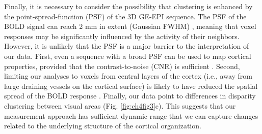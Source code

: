 Finally, it is necessary to consider the possibility that clustering is enhanced by the point-spread-function (PSF) of the 3D GE-EPI sequence. The PSF of the BOLD signal can reach 2 mm in extent (Gaussian FWHM) \cite{Shmuel:2007hs}, meaning that voxel responses may be significantly influenced by the activity of their neighbors. However, it is unlikely that the PSF is a major barrier to the interpretation of our data. First, even a sequence with a broad PSF can be used to map cortical properties, provided that the contrast-to-noise (CNR) is sufficient \cite{Yacoub:2008hr}. Second, limiting our analyses to voxels from central layers of the cortex (i.e., away from large draining vessels on the cortical surface) is likely to have reduced the spatial spread of the BOLD response \cite{Polimeni:2010fl}. Finally, our data point to differences in disparity clustering between visual areas (Fig. \ref{fig:ch4fig3}c). This suggests that our measurement approach has sufficient dynamic range that we can capture changes related to the underlying structure of the cortical organization.

